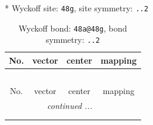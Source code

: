 \documentclass[fleqn,8pt]{jsarticle}
\begin{document}
* Wyckoff site: {\tt 48g}, site symmetry: {\tt ..2}
\renewcommand{\arraystretch}{1.2}
\begin{longtable}{cccc}
\caption{Wyckoff bond: {\tt 48a@48g}, bond symmetry: {\tt ..2}}
 \\
 \hline \hline
No. & vector & center & mapping \\ \hline \endfirsthead

\multicolumn{3}{l}{\tablename\ \thetable{}} \\
 \hline \hline
No. & vector & center & mapping \\ \hline \endhead

 \hline \hline
\multicolumn{3}{r}{\footnotesize\it continued ...} \\ \endfoot

 \hline \hline
\multicolumn{3}{r}{} \\ \endlastfoot


\end{longtable}
\end{document}
